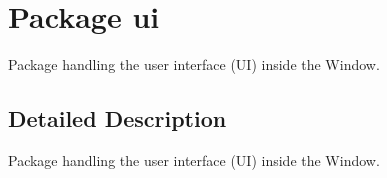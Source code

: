 \hypertarget{namespaceui}{\section{Package ui}
\label{namespaceui}
}


Package handling the user interface (U\-I) inside the Window.  




\subsection{Detailed Description}
Package handling the user interface (U\-I) inside the Window. 